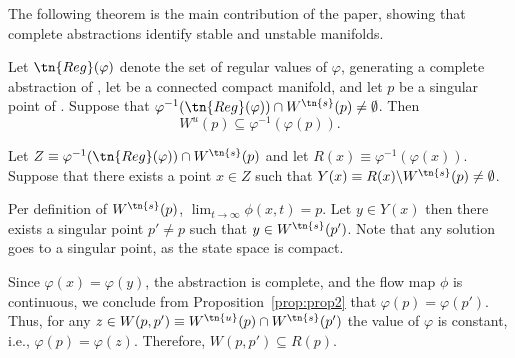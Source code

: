 The following theorem is the main contribution of the paper, showing that complete abstractions identify stable and unstable manifolds.\begin{theorem}\label{thm:res}
Let $\tn{Reg}(\varphi)$ denote the set of regular values of $\varphi$, generating a complete abstraction of \dynSysAll, let \sts be a connected compact manifold, and let $p$ be a singular point of \vectField. Suppose that $\varphi^{-1}(\tn{Reg}(\varphi))\cap W^{\tn{s}}(p)\neq\emptyset$. Then \[W^{u}(p)\subseteq\varphi^{-1}(\varphi(p))  .\]
\end{theorem}
\begin{sketchProof}
Let $Z\equiv\varphi^{-1}(\tn{Reg}(\varphi))\cap W^{\tn{s}}(p)$ and let $R(x)\equiv\varphi^{-1}(\varphi(x))$. Suppose that there exists a point $x\in Z$ such that $Y(x)\equiv R(x)\backslash W^{\tn{s}}(p)\neq\emptyset$.

Per definition of $W^{\tn{s}}(p)$, $\lim_{t\rightarrow\infty}\phi(x,t)= p$. Let $y\in Y(x)$ then there exists a singular point $p'\neq p$ such that $y\in W^{\tn{s}}(p')$. Note that any solution goes to a singular point, as the state space \sts is compact.

Since $\varphi(x)=\varphi(y)$, the abstraction is complete, and the flow map $\phi$ is continuous, we conclude from Proposition~\ref{prop:prop2} that $\varphi(p)=\varphi(p')$. Thus, for any $z\in W(p,p')\equiv W^{\tn{u}}(p)\cap W^{\tn{s}}(p')$ the value of $\varphi$ is constant, i.e., $\varphi(p)=\varphi(z)$. Therefore, $W(p,p')\subseteq R(p)$.


\end{sketchProof}
